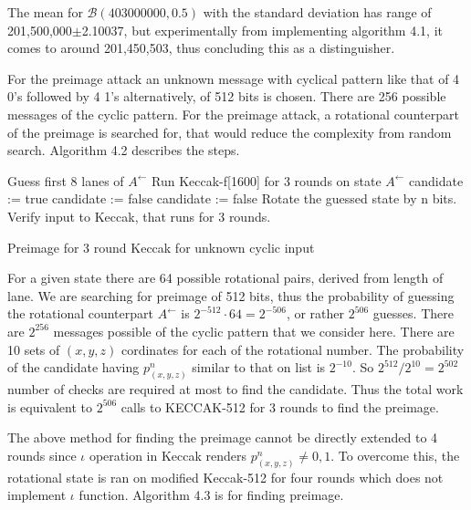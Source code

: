The mean for $\mathcal{B}(403000000, 0.5)$ with the standard deviation has range of 201,500,000$\pm$2.10037, but 
experimentally from implementing algorithm 4.1, it comes to around 201,450,503, thus concluding this as a distinguisher.

For the preimage attack an unknown message with cyclical pattern like that of 4 0's followed by 4 1's alternatively, of
512 bits is chosen. There are 256 possible messages of the cyclic pattern. For the preimage attack, a rotational
counterpart of the preimage is searched for, that would reduce the complexity from random search. Algorithm 4.2 describes
the steps.

\begin{algorithm}[H]
\begin{algorithmic}[1]
  \State Guess first 8 lanes of $A^{\leftarrow}$
  \State Run Keccak-f[1600] for 3 rounds on state $A^{\leftarrow}$
    \State candidate := true
        \State candidate := false
      \EndIf
        \State candidate := false
      \EndIf
    \EndFor
      \State Rotate the guessed state by n bits.
      \State Verify input to Keccak, that runs for 3 rounds.
    \EndIf
  \EndFor
\end{algorithmic}
\caption[Preimage for 3 round Keccak for unknown cyclic input]
{Preimage for 3 round Keccak for unknown cyclic input \cite{00022}}
\label{alg:seq}
\end{algorithm}

For a given state there are 64 possible rotational pairs, derived from length of lane. We are searching for preimage
of 512 bits, thus the probability of guessing the rotational counterpart $A^{\leftarrow}$ is $2^{-512} \cdot 64 = 2^{-506}$,
or rather $2^{506}$ guesses. There are $2^{256}$ messages possible of the cyclic pattern that we consider here. There
are 10 sets of $(x, y, z)$ cordinates for each of the rotational number. The probability of the candidate having 
$p^n_{(x, y, z)}$ similar to that on list is $2^{-10}$. So $2^{512} / 2^{10} = 2^{502}$ number of checks are required
at most to find the candidate. Thus the total work is equivalent to $2^{506}$ calls to KECCAK-512 for 3 rounds to find
the preimage.

The above method for finding the preimage cannot be directly extended to 4 rounds since $\iota$ operation in Keccak
renders $p^n_{(x, y, z)} \neq 0, 1$. To overcome this, the rotational state is ran on modified Keccak-512 for four rounds
which does not implement $\iota$ function. Algorithm 4.3 is for finding preimage.

